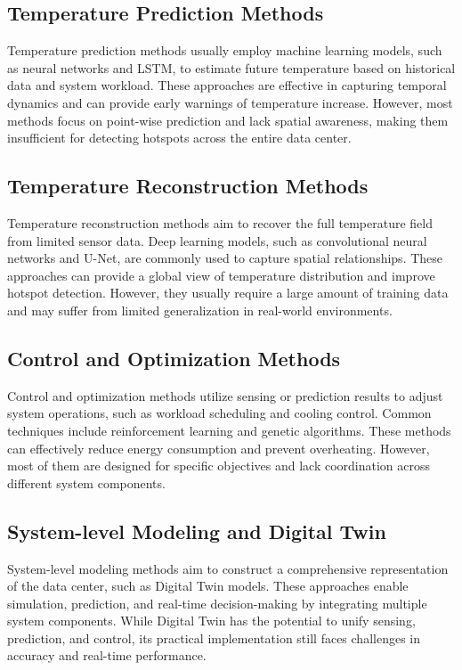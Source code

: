 \documentclass[12pt,a4paper]{article}
\begin{document}
    \subsection{Temperature Prediction Methods}
    Temperature prediction methods usually employ machine learning models, such as neural networks and LSTM, to estimate future temperature based on historical data and system workload. These approaches are effective in capturing temporal dynamics and can provide early warnings of temperature increase. However, most methods focus on point-wise prediction and lack spatial awareness, making them insufficient for detecting hotspots across the entire data center.

    \subsection{Temperature Reconstruction Methods}
    Temperature reconstruction methods aim to recover the full temperature field from limited sensor data. Deep learning models, such as convolutional neural networks and U-Net, are commonly used to capture spatial relationships. These approaches can provide a global view of temperature distribution and improve hotspot detection. However, they usually require a large amount of training data and may suffer from limited generalization in real-world environments.

    \subsection{Control and Optimization Methods}
    Control and optimization methods utilize sensing or prediction results to adjust system operations, such as workload scheduling and cooling control. Common techniques include reinforcement learning and genetic algorithms. These methods can effectively reduce energy consumption and prevent overheating. However, most of them are designed for specific objectives and lack coordination across different system components.

    \subsection{System-level Modeling and Digital Twin}
    System-level modeling methods aim to construct a comprehensive representation of the data center, such as Digital Twin models. These approaches enable simulation, prediction, and real-time decision-making by integrating multiple system components. While Digital Twin has the potential to unify sensing, prediction, and control, its practical implementation still faces challenges in accuracy and real-time performance.
\end{document}
